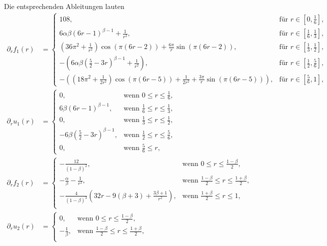 Die entsprechenden Ableitungen lauten
\begin{align*}
  \partial_r f_1(r)&=
  \begin{cases}
    108,&
    \text{für } r\in\left[0,\frac{1}{6}\right],\\
    6\alpha\beta(6r-1)^{\beta-1} +\frac{1}{r^2}, &
    \text{für } r\in\left[\frac{1}{6},\frac{1}{3}\right],\\
    (36\pi^2+\frac{1}{r^2})\cos(\pi(6r-2))+
    \frac{6\pi}{r}\sin(\pi(6r-2)), &
    \text{für } r\in\left[\frac{1}{3},\frac{1}{2}\right],\\
    -\left(6\alpha\beta\left( \frac{5}{2}-3r \right)^{\beta-1}+
    \frac{1}{r^2}\right),&
    \text{für } r\in\left[\frac{1}{2},\frac{5}{6}\right],\\
    -\left( \left( 18\pi^2+\frac{1}{2r^2} \right)\cos(\pi(6r-5))
    +\frac{1}{2r^2} + \frac{3\pi}{r}\sin(\pi(6r-5))\right), 
    &\text{für } r\in\left[\frac{5}{6},1\right],
  \end{cases}\\
  \partial_r u_1(r) &= 
  \begin{cases}
    0,&\text{wenn }0\leq r\leq\frac{1}{6},\\
    6\beta(6r-1)^{\beta-1}, &\text{wenn } \frac{1}{6}\leq r\leq\frac{1}{3},\\
    0, &\text{wenn } \frac{1}{3}\leq r\leq\frac{1}{2},\\
    -6\beta\left( \frac{5}{2}-3r \right)^{\beta-1},&
    \text{wenn } \frac{1}{2}\leq r\leq\frac{5}{6},\\
    0,&\text{wenn } \frac{5}{6}\leq r,
  \end{cases}\\
  \partial_r f_2(r) &= 
  \begin{cases}
    -\frac{12}{(1-\beta)^2},&\text{wenn }0\leq r\leq\frac{1-\beta}{2},\\
    -\frac{\alpha}{\beta}-\frac{1}{r^2},&
    \text{wenn } \frac{1-\beta}{2}\leq r\leq \frac{1+\beta}{2},\\
    -\frac{4}{(1-\beta)^3}\left( 32r-9(\beta+3)+\frac{3\beta+1}{r^2} \right),&
    \text{wenn } \frac{1+\beta}{2}\leq r\leq 1,\\
  \end{cases}\\
  \partial_r u_2(r) &= 
  \begin{cases}
    0,&\text{wenn }0\leq r\leq\frac{1-\beta}{2},\\
    -\frac{1}{\beta},&
    \text{wenn } \frac{1-\beta}{2}\leq r\leq \frac{1+\beta}{2},\\

\end{cases}
\end{align*}
